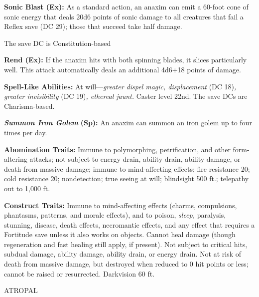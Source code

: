 \documentclass{article}
\begin{document}
\textbf{Sonic Blast (Ex):} As a standard action, an anaxim can emit a 60-foot cone 
of sonic energy that deals 20d6 points of sonic damage to all creatures that fail 
a Reflex save (DC 29); those that succeed take half damage. 

The save DC is Constitution-based

\textbf{Rend (Ex):} If the anaxim hits with both spinning blades, it slices particularly 
well. This attack automatically deals an additional 4d6+18 points of damage. 

\textbf{Spell-Like Abilities:} At will---\textit{greater dispel magic, displacement} 
(DC 18)\textit{, greater invisibility} (DC 19)\textit{, ethereal jaunt. }Caster 
level 22nd. The save DCs are Charisma-based.

\textit{\textbf{Summon Iron Golem }}\textbf{(Sp):} An anaxim can summon an iron 
golem up to four times per day. 

\textbf{Abomination Traits:} Immune to polymorphing, petrification, and other form-altering 
attacks; not subject to energy drain, ability drain, ability damage, or death from 
massive damage; immune to mind-affecting effects; fire resistance 20; cold resistance 
20; nondetection; true seeing at will; blindsight 500 ft.; telepathy out to 1,000 
ft. 

\textbf{Construct Traits:} Immune to mind-affecting effects (charms, compulsions, 
phantasms, patterns, and morale effects), and to poison, \textit{sleep, }paralysis, 
stunning, disease, death effects, necromantic effects, and any effect that requires 
a Fortitude save unless it also works on objects. Cannot heal damage (though regeneration 
and fast healing still apply, if present). Not subject to critical hits, subdual 
damage, ability damage, ability drain, or energy drain. Not at risk of death from 
massive damage, but destroyed when reduced to 0 hit points or less; cannot be raised 
or resurrected. Darkvision 60 ft. 

\vspace{12pt}
{\LARGE{}ATROPAL }
\end{document}

